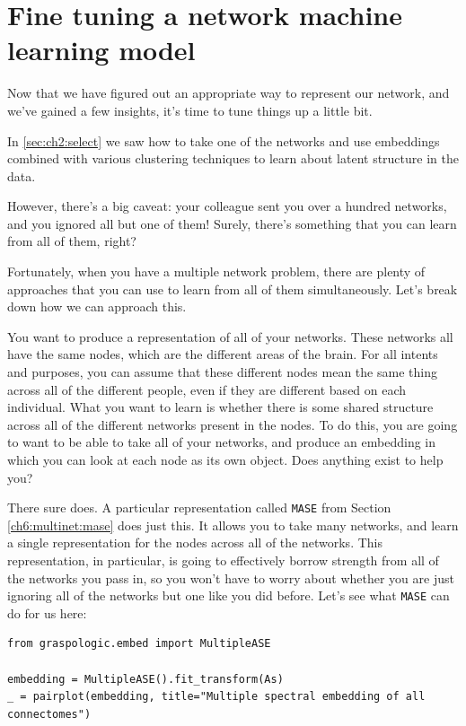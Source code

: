 \section{Fine tuning a network machine learning model}
\label{sec:ch2:finetune}

Now that we have figured out an appropriate way to represent our network, and we've gained a few insights, it's time to tune things up a little bit.

In \ref{sec:ch2:select} we saw how to take one of the networks and use embeddings combined with various clustering techniques to learn about latent structure in the data.

However, there's a big caveat: your colleague sent you over a hundred networks, and you ignored all but one of them! Surely, there's something that you can learn from all of them, right?

Fortunately, when you have a multiple network problem, there are plenty of approaches that you can use to learn from all of them simultaneously. Let's break down how we can approach this.

You want to produce a representation of all of your networks. These networks all have the same nodes, which are the different areas of the brain. For all intents and purposes, you can assume that these different nodes mean the same thing across all of the different people, even if they are different based on each individual. What you want to learn is whether there is some {shared} structure across all of the different networks present in the nodes. To do this, you are going to want to be able to take {all} of your networks, and produce an embedding in which you can look at each {node} as its own object. Does anything exist to help you?

There sure does. A particular representation called \texttt{MASE} from Section \ref{ch6:multinet:mase} does just this. It allows you to take many networks, and learn a single representation for the nodes across all of the networks. This representation, in particular, is going to effectively {borrow strength} from all of the networks you pass in, so you won't have to worry about whether you are just ignoring all of the networks but one like you did before. Let's see what \texttt{MASE} can do for us here:


\begin{lstlisting}[style=python]
from graspologic.embed import MultipleASE

embedding = MultipleASE().fit_transform(As)
_ = pairplot(embedding, title="Multiple spectral embedding of all connectomes")
\end{lstlisting}

